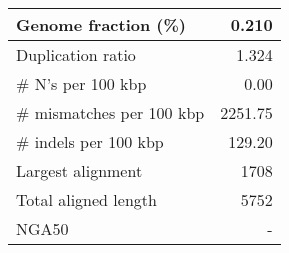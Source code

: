 \documentclass[12pt,a4paper]{article}
\begin{document}
\begin{table}[ht]
\begin{center}
\begin{tabular}{|l*{1}{|r}|}
Genome fraction (\%) & 0.210 \\ \hline
Duplication ratio & 1.324 \\ \hline
\# N's per 100 kbp & 0.00 \\ \hline
\# mismatches per 100 kbp & 2251.75 \\ \hline
\# indels per 100 kbp & 129.20 \\ \hline
Largest alignment & 1708 \\ \hline
Total aligned length & 5752 \\ \hline
NGA50 & - \\ \hline
\end{tabular}
\end{center}
\end{table}
\end{document}

